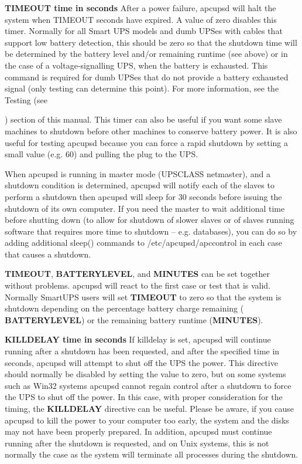 {{{{{{{{{\begin{description}
\item {\bf TIMEOUT \lt{}time in seconds\gt{}}
   After a power failure, apcupsd will halt the system when TIMEOUT seconds have
expired.  A value of zero disables this timer. Normally for all Smart UPS
models and dumb UPSes with cables that support low battery detection, this
should be zero so that the shutdown time will be determined by the battery
level and/or remaining runtime (see above) or in the case of a
voltage-signalling UPS, when the battery is exhausted.  This command is
required for dumb UPSes that do not provide a battery exhausted signal (only
testing can determine this point).  For more information, see the Testing (see

) section of this manual. 
This timer can also be useful if you want some slave machines to shutdown
before other machines to conserve battery power.  It is also useful for
testing apcupsd because you can force a rapid shutdown by setting a small
value (e.g.  60) and pulling the plug to the UPS.  

When apcupsd is running in master mode (UPSCLASS netmaster), and a shutdown
condition is determined, apcupsd will notify each of the slaves to perform a
shutdown then apcupsd will sleep for 30 seconds before issuing the shutdown of
its own computer. If you need the master to wait additional time before
shutting down (to allow for shutdown of slower slaves or of slaves running
software that requires more time to shutdown {--} e.g. databases), you can do
so by adding additional sleep() commands to /etc/apcupsd/apccontrol in each
case that causes a shutdown.  

{\bf TIMEOUT}, {\bf BATTERYLEVEL}, and {\bf MINUTES} can be set together
without problems.  apcupsd will react to the first case or test that is valid.
Normally SmartUPS users will set {\bf TIMEOUT} to zero so that the system is
shutdown depending on the percentage battery charge remaining ({\bf
BATTERYLEVEL}) or the remaining battery runtime ({\bf MINUTES}).  

\label{KILLDELAY-_003ctime-in-seconds_003e}

\item {\bf KILLDELAY \lt{}time in seconds\gt{}}
   If killdelay is set, apcupsd will continue running after a shutdown has been
requested, and after the specified time in seconds, apcupsd will attempt to
shut off the UPS the power. This directive should normally be disabled by
setting the value to zero, but on some systems such as Win32 systems apcupsd
cannot regain control after a shutdown to force the UPS to shut off the power.
In this case, with proper consideration for the timing, the {\bf KILLDELAY}
directive can be useful.  Please be aware, if you cause apcupsd to kill the
power to your computer too early, the system and the disks may not have been
properly prepared.  In addition, apcupsd must continue running after the
shutdown is requested, and on Unix systems, this is not normally the case as
the system will terminate all processes during the shutdown.  
\end{description}

}}}}}}}}}
